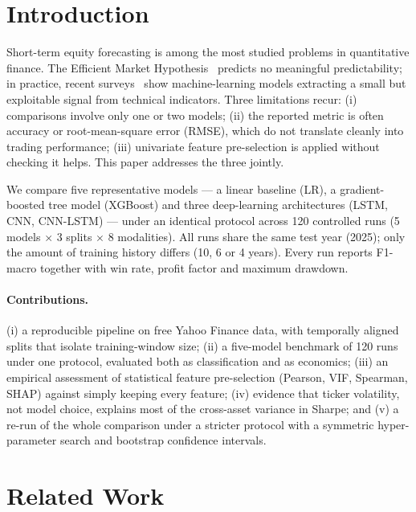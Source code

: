 \documentclass[runningheads]{llncs}
\begin{document}
\section{Introduction}

Short-term equity forecasting is among the most studied problems in quantitative finance. The Efficient Market Hypothesis~\cite{fama1970} predicts no meaningful predictability; in practice, recent surveys~\cite{sezer2020,jiang2021} show machine-learning models extracting a small but exploitable signal from technical indicators. Three limitations recur: (i) comparisons involve only one or two models; (ii) the reported metric is often accuracy or root-mean-square error (RMSE), which do not translate cleanly into trading performance; (iii) univariate feature pre-selection is applied without checking it helps. This paper addresses the three jointly.

We compare five representative models --- a linear baseline (LR), a gradient-boosted tree model (XGBoost) and three deep-learning architectures (LSTM, CNN, CNN-LSTM) --- under an identical protocol across 120 controlled runs (5 models $\times$ 3 splits $\times$ 8 modalities). All runs share the same test year (2025); only the amount of training history differs (10, 6 or 4 years). Every run reports F1-macro together with win rate, profit factor and maximum drawdown.

\paragraph{Contributions.}
(i) a reproducible pipeline on free Yahoo Finance data, with temporally aligned
splits that isolate training-window size; (ii) a five-model benchmark of 120 runs
under one protocol, evaluated both as classification and as economics; (iii) an
empirical assessment of statistical feature pre-selection (Pearson, VIF, Spearman,
SHAP) against simply keeping every feature; (iv) evidence that ticker volatility,
not model choice, explains most of the cross-asset variance in Sharpe; and (v) a
re-run of the whole comparison under a stricter protocol with a symmetric
hyper-parameter search and bootstrap confidence intervals.

\section{Related Work}
\label{sec:related}
\end{document}
